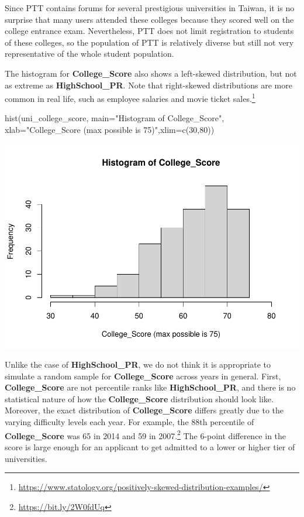 \documentclass[
]{article}
\newenvironment{Shaded}{\begin{snugshade}}{\end{snugshade}}
\newcommand{\AttributeTok}[1]{\textcolor[rgb]{0.77,0.63,0.00}{#1}}
\newcommand{\DecValTok}[1]{\textcolor[rgb]{0.00,0.00,0.81}{#1}}
\newcommand{\FunctionTok}[1]{\textcolor[rgb]{0.00,0.00,0.00}{#1}}
\newcommand{\NormalTok}[1]{#1}
\newcommand{\StringTok}[1]{\textcolor[rgb]{0.31,0.60,0.02}{#1}}
\begin{document}
Since PTT contains forums for several prestigious universities in
Taiwan, it is no surprise that many users attended these colleges
because they scored well on the college entrance exam. Nevertheless, PTT
does not limit registration to students of these colleges, so the
population of PTT is relatively diverse but still not very
representative of the whole student population.

The histogram for \textbf{College\_Score} also shows a left-skewed
distribution, but not as extreme as \textbf{HighSchool\_PR}. Note that
right-skewed distributions are more common in real life, such as
employee salaries and movie ticket sales.\footnote{\url{https://www.statology.org/positively-skewed-distribution-examples/}}

\begin{Shaded}
\begin{Highlighting}[]
\FunctionTok{hist}\NormalTok{(uni\_college\_score, }\AttributeTok{main=}\StringTok{"Histogram of College\_Score"}\NormalTok{,}
     \AttributeTok{xlab=}\StringTok{"College\_Score (max possible is 75)"}\NormalTok{,}\AttributeTok{xlim=}\FunctionTok{c}\NormalTok{(}\DecValTok{30}\NormalTok{,}\DecValTok{80}\NormalTok{))}
\end{Highlighting}
\end{Shaded}

\includegraphics{PTT_Analysis_of_Test_Scores_Unfinished_files/figure-latex/college-score-histogram-1.pdf}

Unlike the case of \textbf{HighSchool\_PR}, we do not think it is
appropriate to simulate a random sample for \textbf{College\_Score}
across years in general. First, \textbf{College\_Score} are not
percentile ranks like \textbf{HighSchool\_PR}, and there is no
statistical nature of how the \textbf{College\_Score} distribution
should look like. Moreover, the exact distribution of
\textbf{College\_Score} differs greatly due to the varying difficulty
levels each year. For example, the 88th percentile of
\textbf{College\_Score} was 65 in 2014 and 59 in 2007.\footnote{\url{https://bit.ly/2W0fdUq}}
The 6-point difference in the score is large enough for an applicant to
get admitted to a lower or higher tier of universities.
\end{document}
